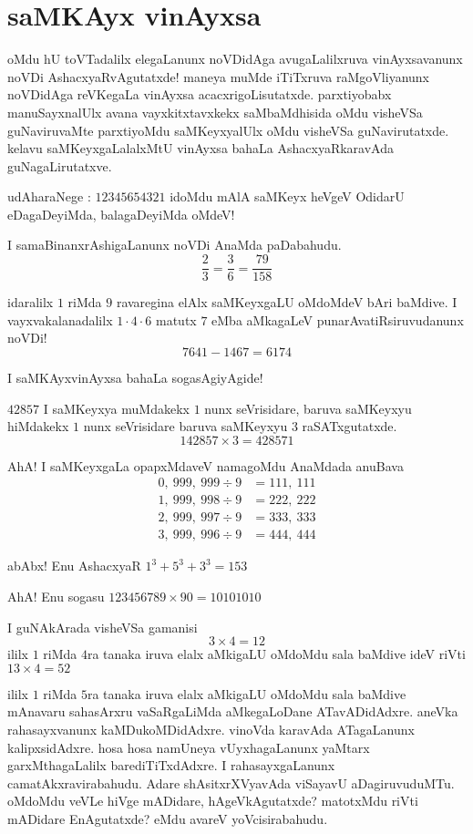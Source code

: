 \chapter{saMKAyx vinAyxsa}

oMdu hU toVTadalilx elegaLanunx noVDidAga avugaLalilxruva vinAyxsavanunx noVDi AshacxyaRvAgutatxde! maneya muMde iTiTxruva raMgoVliyanunx noVDidAga reVKegaLa vinAyxsa acacxrigoLisutatxde. parxtiyobabx manuSayxnalUlx avana vayxkitxtavxkekx saMbaMdhisida oMdu visheVSa guNaviruvaMte parxtiyoMdu saMKeyxyalUlx oMdu visheVSa guNavirutatxde. kelavu saMKeyxgaLalalxMtU vinAyxsa bahaLa AshacxyaRkaravAda guNagaLirutatxve. 

udAharaNege : $12345654321$ idoMdu mAlA saMKeyx heVgeV OdidarU eDagaDeyiMda, balagaDeyiMda oMdeV!

I samaBinanxrAshigaLanunx noVDi AnaMda paDabahudu.
$$
\frac{2}{3} = \frac{3}{6} = \frac{79}{158}
$$

idaralilx $1$ riMda $9$ ravaregina elAlx saMKeyxgaLU oMdoMdeV bAri baMdive. I vayxvakalanadalilx $1 \cdot 4 \cdot 6$ matutx $7$ eMba aMkagaLeV punarAvatiRsiruvudanunx noVDi!
$$
7641-1467 = 6174
$$

I saMKAyxvinAyxsa bahaLa sogasAgiyAgide!

$42857$ I saMKeyxya muMdakekx $1$ nunx seVrisidare, baruva saMKeyxyu hiMdakekx $1$ nunx seVrisidare baruva saMKeyxyu $3$ raSATxgutatxde.
$$
142857 \times 3 = 428571
$$

AhA! I saMKeyxgaLa opapxMdaveV namagoMdu AnaMdada anuBava
\begin{align*}
0, ~ 999, ~999 \div 9 & =111, ~111\\
1, ~999,~998 \div 9& =222, ~222\\
2,~999,~997 \div 9 &=333, ~ 333\\
3,~999, ~996 \div 9&=444, ~444
\end{align*}

abAbx! Enu AshacxyaR $1^3 + 5^3 + 3^3 = 153$

AhA! Enu sogasu $123456789 \times 90=10101010$

I guNAkArada visheVSa gamanisi
$$
3 \times 4 = 12
$$
ililx $1$ riMda $4$ra tanaka iruva elalx aMkigaLU oMdoMdu sala baMdive ideV riVti $13 \times 4 = 52$

ililx $1$ riMda $5$ra tanaka iruva elalx aMkigaLU oMdoMdu sala baMdive mAnavaru sahasArxru vaSaRgaLiMda aMkegaLoDane ATavADidAdxre. aneVka rahasayxvanunx kaMDukoMDidAdxre. vinoVda karavAda ATagaLanunx kalipxsidAdxre. hosa hosa namUneya vUyxhagaLanunx yaMtarx garxMthagaLalilx barediTiTxdAdxre. I rahasayxgaLanunx camatAkxravirabahudu.  Adare shAsitxrXVyavAda viSayavU aDagiruvuduMTu. oMdoMdu veVLe hiVge mADidare, hAgeVkAgutatxde? matotxMdu riVti mADidare EnAgutatxde? eMdu avareV yoVcisirabahudu.

